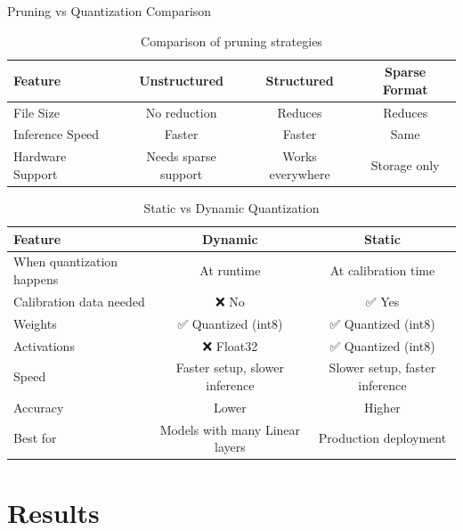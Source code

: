 \documentclass[aspectratio=169,xcolor=dvipsnames]{beamer}
\begin{document}
\begin{frame}{Pruning vs Quantization Comparison}
    \begin{table}
        \centering
        \footnotesize
        \begin{tabular}{l c c c}
            \toprule
            \textbf{Feature} & \textbf{Unstructured} & \textbf{Structured} & \textbf{Sparse Format} \\
            \midrule
            File Size & No reduction & Reduces & Reduces \\
            Inference Speed & Faster & Faster & Same \\
            Hardware Support & Needs sparse support & Works everywhere & Storage only \\
            \bottomrule
        \end{tabular}
        \caption{Comparison of pruning strategies}
    \end{table}
    
    \vspace{0.3cm}
    
    \begin{table}
        \centering
        \footnotesize
        \begin{tabular}{l c c}
            \toprule
            \textbf{Feature} & \textbf{Dynamic} & \textbf{Static} \\
            \midrule
            When quantization happens & At runtime & At calibration time \\
            Calibration data needed & ❌ No & ✅ Yes \\
            Weights & ✅ Quantized (int8) & ✅ Quantized (int8) \\
            Activations & ❌ Float32 & ✅ Quantized (int8) \\
            Speed & Faster setup, slower inference & Slower setup, faster inference \\
            Accuracy & Lower & Higher \\
            Best for & Models with many Linear layers & Production deployment \\
            \bottomrule
        \end{tabular}
        \caption{Static vs Dynamic Quantization}
    \end{table}
\end{frame}

\section{Results}
\end{document}
